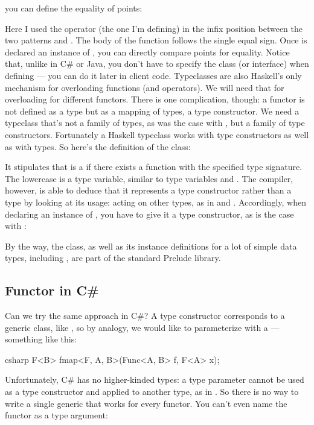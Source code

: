 you can define the equality of points:

Here I used the operator \code{(==)} (the one I'm defining) in the
infix position between the two patterns  and
. The body of the function follows the
single equal sign. Once  is declared an instance of
, you can directly compare points for equality. Notice that,
unlike in C\# or Java, you don't have to specify the  class
(or interface) when defining  --- you can do it later in
client code. Typeclasses are also Haskell's only mechanism for
overloading functions (and operators). We will need that for overloading
 for different functors. There is one complication, though:
a functor is not defined as a type but as a mapping of types, a type
constructor. We need a typeclass that's not a family of types, as was
the case with , but a family of type constructors.
Fortunately a Haskell typeclass works with type constructors as well as
with types. So here's the definition of the  class:

It stipulates that  is a  if there exists a
function  with the specified type signature. The lowercase
 is a type variable, similar to type variables  and
. The compiler, however, is able to deduce that it represents
a type constructor rather than a type by looking at its usage: acting on
other types, as in  and . Accordingly, when
declaring an instance of , you have to give it a type
constructor, as is the case with :

By the way, the  class, as well as its instance
definitions for a lot of simple data types, including ,
are part of the standard Prelude library.

\subsection{Functor in C\#}

Can we try the same approach in C\#? A type constructor corresponds to a
generic class, like , so by analogy, we would like to
parameterize  with a 
 --- something like this:

\begin{snip}{csharp}
F<B> fmap<F, A, B>(Func<A, B> f, F<A> x);
\end{snip}
Unfortunately, C\# has no higher-kinded types: a type parameter
 cannot be used as a type constructor and applied to another
type, as in . So there is no way to write a single generic
 that works for every functor. You can't even name the
functor as a type argument:

